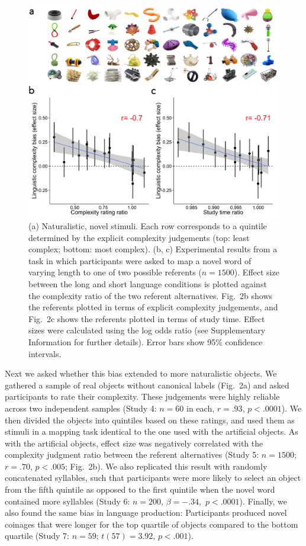 \documentclass[12pt]{article}
\begin{document}
\begin{figure}[ht!]
\begin{center}
\includegraphics{figs/FIG_2.png}
\caption{(a) Naturalistic, novel stimuli. Each row corresponds to a quintile determined by the explicit complexity judgements (top: least complex; bottom: most complex). (b, c) Experimental results from a task in which participants were asked to map a novel word of varying length to one of two possible referents  ($n=1500$). Effect size between the long and short language conditions is plotted against the complexity ratio of the two referent alternatives. Fig.\ 2b shows the referents plotted in terms of explicit complexity judgements, and Fig.\ 2c shows the referents plotted in terms of study time. Effect sizes were calculated using the log odds ratio (see Supplementary Information for further details). Error bars show 95\% confidence intervals.}
\end{center}
\label{fig:real_objs}
\end{figure}

Next we asked whether this bias extended to more naturalistic objects. We gathered a sample of real objects without canonical labels (Fig.\ 2a) and asked participants to rate their complexity. These judgements were highly reliable across two independent samples (Study 4: $n = 60$ in each, $r = .93$, $p < .0001$). We then divided the objects into quintiles based on these ratings, and used them as stimuli in a mapping task identical to the one used with the artificial objects. As with the artificial objects, effect size was negatively correlated with the complexity judgment ratio between the referent alternatives (Study 5: $n = 1500$; $r = .70$, $p < .005$; Fig.\ 2b). We also replicated this result with randomly concatenated syllables, such that participants were more likely to select an object from the fifth quintile as opposed to the first quintile when the novel word contained more syllables (Study 6: $n=200$, $\beta=-.34,$ $p <.0001$). Finally, we  also found the same bias in language production: Participants produced novel coinages that were longer for the top quartile of objects compared to the bottom quartile (Study 7: $n = 59$; $t(57) = 3.92$, $p < .001$). 
					
\end{document}
